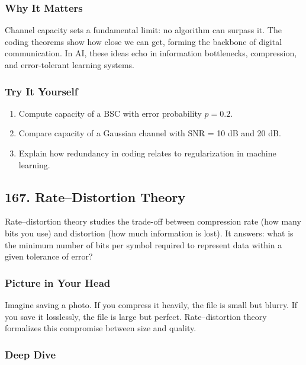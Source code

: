 \documentclass[
  letterpaper,
  DIV=11,
  numbers=noendperiod]{scrreprt}
\providecommand{\tightlist}{%
  \setlength{\itemsep}{0pt}\setlength{\parskip}{0pt}}
\begin{document}
\subsubsection{Why It Matters}\label{why-it-matters-63}

Channel capacity sets a fundamental limit: no algorithm can surpass it.
The coding theorems show how close we can get, forming the backbone of
digital communication. In AI, these ideas echo in information
bottlenecks, compression, and error-tolerant learning systems.

\subsubsection{Try It Yourself}\label{try-it-yourself-165}

\begin{enumerate}
\def\labelenumi{\arabic{enumi}.}
\tightlist
\item
  Compute capacity of a BSC with error probability \(p=0.2\).
\item
  Compare capacity of a Gaussian channel with SNR = 10 dB and 20 dB.
\item
  Explain how redundancy in coding relates to regularization in machine
  learning.
\end{enumerate}

\subsection{167. Rate--Distortion Theory}\label{ratedistortion-theory}

Rate--distortion theory studies the trade-off between compression rate
(how many bits you use) and distortion (how much information is lost).
It answers: what is the minimum number of bits per symbol required to
represent data within a given tolerance of error?

\subsubsection{Picture in Your Head}\label{picture-in-your-head-166}

Imagine saving a photo. If you compress it heavily, the file is small
but blurry. If you save it losslessly, the file is large but perfect.
Rate--distortion theory formalizes this compromise between size and
quality.

\subsubsection{Deep Dive}\label{deep-dive-166}
\end{document}
